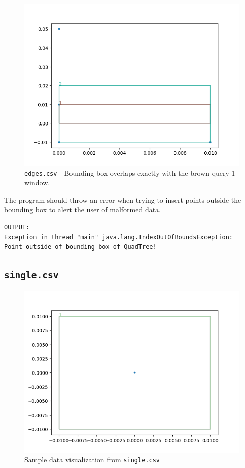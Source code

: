 \documentclass[12pt]{article}
\begin{document}
{\begin{figure}
    \centering
    \includegraphics[scale=0.8]{../img/edges.png}
    \caption{\texttt{edges.csv} - Bounding box overlaps exactly with the brown query 1 window.}
    \label{fig:my_label}
\end{figure}

The program should throw an error when trying to insert points outside the bounding box to alert the user of malformed data.

\begin{verbatim}
OUTPUT:
Exception in thread "main" java.lang.IndexOutOfBoundsException:
Point outside of bounding box of QuadTree!
\end{verbatim}

\subsection{\texttt{single.csv}}
\begin{figure}
    \centering
    \includegraphics[scale=0.8]{../img/single.png}
    \caption{Sample data visualization from \texttt{single.csv}}
    \label{fig:my_label}
\end{figure}

}
\end{document}
